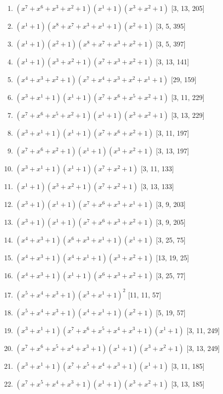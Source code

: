 \documentclass[10pt,twocolumn]{article}
\begin{document}
\begin{enumerate}
\item $(x^{7} + x^{6} + x^{3} + x^{2} + 1)(x^{1} + 1)(x^{3} + x^{2} + 1)$  [3, 13, 205]
\item $(x^{1} + 1)(x^{8} + x^{7} + x^{3} + x^{1} + 1)(x^{2} + 1)$  [3, 5, 395]
\item $(x^{1} + 1)(x^{2} + 1)(x^{8} + x^{7} + x^{3} + x^{2} + 1)$  [3, 5, 397]
\item $(x^{1} + 1)(x^{3} + x^{2} + 1)(x^{7} + x^{3} + x^{2} + 1)$  [3, 13, 141]
\item $(x^{4} + x^{3} + x^{2} + 1)(x^{7} + x^{4} + x^{3} + x^{2} + x^{1} + 1)$  [29, 159]
\item $(x^{3} + x^{1} + 1)(x^{1} + 1)(x^{7} + x^{6} + x^{5} + x^{2} + 1)$  [3, 11, 229]
\item $(x^{7} + x^{6} + x^{5} + x^{2} + 1)(x^{1} + 1)(x^{3} + x^{2} + 1)$  [3, 13, 229]
\item $(x^{3} + x^{1} + 1)(x^{1} + 1)(x^{7} + x^{6} + x^{2} + 1)$  [3, 11, 197]
\item $(x^{7} + x^{6} + x^{2} + 1)(x^{1} + 1)(x^{3} + x^{2} + 1)$  [3, 13, 197]
\item $(x^{3} + x^{1} + 1)(x^{1} + 1)(x^{7} + x^{2} + 1)$  [3, 11, 133]
\item $(x^{1} + 1)(x^{3} + x^{2} + 1)(x^{7} + x^{2} + 1)$  [3, 13, 133]
\item $(x^{3} + 1)(x^{1} + 1)(x^{7} + x^{6} + x^{3} + x^{1} + 1)$  [3, 9, 203]
\item $(x^{3} + 1)(x^{1} + 1)(x^{7} + x^{6} + x^{3} + x^{2} + 1)$  [3, 9, 205]
\item $(x^{4} + x^{3} + 1)(x^{6} + x^{3} + x^{1} + 1)(x^{1} + 1)$  [3, 25, 75]
\item $(x^{4} + x^{3} + 1)(x^{4} + x^{1} + 1)(x^{3} + x^{2} + 1)$  [13, 19, 25]
\item $(x^{4} + x^{3} + 1)(x^{1} + 1)(x^{6} + x^{3} + x^{2} + 1)$  [3, 25, 77]
\item $(x^{5} + x^{4} + x^{3} + 1)(x^{3} + x^{1} + 1)^{2}$  [11, 11, 57]
\item $(x^{5} + x^{4} + x^{3} + 1)(x^{4} + x^{1} + 1)(x^{2} + 1)$  [5, 19, 57]
\item $(x^{3} + x^{1} + 1)(x^{7} + x^{6} + x^{5} + x^{4} + x^{3} + 1)(x^{1} + 1)$  [3, 11, 249]
\item $(x^{7} + x^{6} + x^{5} + x^{4} + x^{3} + 1)(x^{1} + 1)(x^{3} + x^{2} + 1)$  [3, 13, 249]
\item $(x^{3} + x^{1} + 1)(x^{7} + x^{5} + x^{4} + x^{3} + 1)(x^{1} + 1)$  [3, 11, 185]
\item $(x^{7} + x^{5} + x^{4} + x^{3} + 1)(x^{1} + 1)(x^{3} + x^{2} + 1)$  [3, 13, 185]

\end{enumerate}
\end{document}
